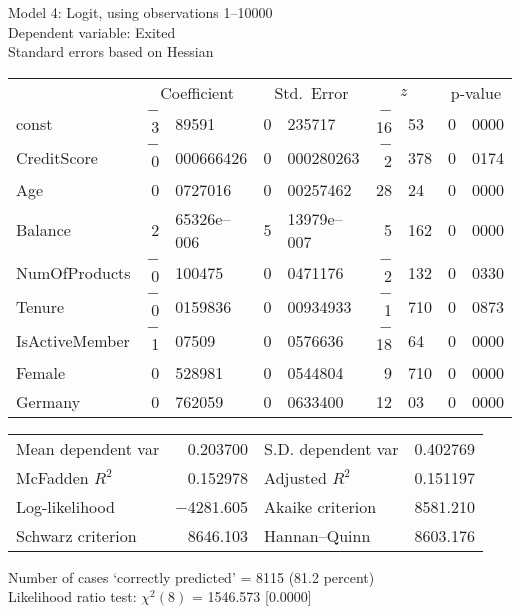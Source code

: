 \documentclass[11pt]{article}
\begin{document}
\thispagestyle{empty}

\begin{center}

Model 4: Logit, using observations 1--10000\\
Dependent variable: Exited\\
Standard errors based on Hessian

\vspace{1em}

\begin{tabular}{lr@{.}lr@{.}lr@{.}lr@{.}l}
  &
 \multicolumn{2}{c}{Coefficient} &
  \multicolumn{2}{c}{Std.\ Error} &
   \multicolumn{2}{c}{$z$} &
    \multicolumn{2}{c}{p-value} \\[1ex]
const &
  $-$3&89591 &
    0&235717 &
      $-$16&53 &
        0&0000 \\
CreditScore &
  $-$0&000666426 &
    0&000280263 &
      $-$2&378 &
        0&0174 \\
Age &
  0&0727016 &
    0&00257462 &
      28&24 &
        0&0000 \\
Balance &
  2&65326\textrm{e--006} &
    5&13979\textrm{e--007} &
      5&162 &
        0&0000 \\
NumOfProducts &
  $-$0&100475 &
    0&0471176 &
      $-$2&132 &
        0&0330 \\
Tenure &
  $-$0&0159836 &
    0&00934933 &
      $-$1&710 &
        0&0873 \\
IsActiveMember &
  $-$1&07509 &
    0&0576636 &
      $-$18&64 &
        0&0000 \\
Female &
  0&528981 &
    0&0544804 &
      9&710 &
        0&0000 \\
Germany &
  0&762059 &
    0&0633400 &
      12&03 &
        0&0000 \\
\end{tabular}

\vspace{1ex}
\begin{tabular}{lrlr}
Mean dependent var &  0.203700 & S.D. dependent var &  0.402769 \\
McFadden $R^2$ &  0.152978 & Adjusted $R^2$ &  0.151197 \\
Log-likelihood & $-$4281.605 & Akaike criterion &  8581.210 \\
Schwarz criterion &  8646.103 & Hannan--Quinn &  8603.176 \\
\end{tabular}


\vspace{1ex}
\vspace{1em}
\begin{raggedright}
Number of cases `correctly predicted' = 8115 (81.2 percent)\\
Likelihood ratio test: $\chi^2(8)$ = 1546.573 [0.0000]\\
\end{raggedright}

\end{center}
\end{document}
